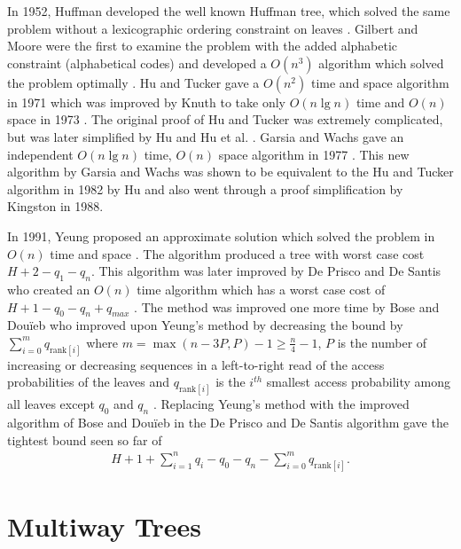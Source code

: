 \documentclass[letterpaper,12pt,titlepage,oneside,final]{book}
\theoremstyle{plain}
\begin{document}
In 1952, Huffman developed the well known Huffman tree, which solved the same problem without a lexicographic ordering constraint on leaves \cite{huffman1952method}. Gilbert and Moore were the first to examine the problem with the added alphabetic constraint (alphabetical codes) and developed a $O(n^3)$ algorithm which solved the problem optimally \cite{gilbert1959variable}. Hu and Tucker gave a $O(n^2)$ time and space algorithm in 1971 \cite{hu1971optimal} which was improved by Knuth to take only $O(n \lg n)$ time and $O(n)$ space in 1973 \cite{knuth1973sorting}. The original proof of Hu and Tucker was extremely complicated, but was later simplified by Hu \cite{hu1973new} and Hu et al. \cite{hu1979binary}. Garsia and Wachs gave an independent $O(n \lg n)$ time, $O(n)$ space algorithm in 1977 \cite{garsia1977new}. This new algorithm by Garsia and Wachs was shown to be equivalent to the Hu and Tucker algorithm in 1982 by Hu \cite{Hu1982Book} and also went through a proof simplification \cite{kingston1988new} by Kingston in 1988.

In 1991, Yeung proposed an approximate solution which solved the problem in $O(n)$ time and space \cite{yeung1991alphabetic}. The algorithm produced a tree with worst case cost $H + 2 - q_1-q_n$. This algorithm was later improved by De Prisco and De Santis who created an $O(n)$ time algorithm which has a worst case cost of $H+1-q_0-q_n+q_{max}$ \cite{de1993binary}. The method was improved one more time by Bose and Dou\"{i}eb who improved upon Yeung's method by decreasing the bound by $\sum_{i=0}^m q_{\text{rank}[i]}$ where $m=\max({n-3P,P})-1 \geq \frac{n}{4} - 1$, $P$ is the number of increasing or decreasing sequences in a left-to-right read of the access probabilities of the leaves and $q_{\text{rank}[i]}$ is the $i^{th}$ smallest access probability among all leaves except $q_0$ and $q_n$ \cite{bose2009efficient}. Replacing Yeung's method with the improved algorithm of Bose and Dou\"{i}eb in the De Prisco and De Santis algorithm gave the tightest bound seen so far of 
\begin{align*}
H+1+\sum_{i=1}^{n}q_i-q_0-q_n-\sum_{i=0}^m q_{\text{rank}[i]}. 
\end{align*}

\section{Multiway Trees} \label{sec:MWT}
\end{document}
